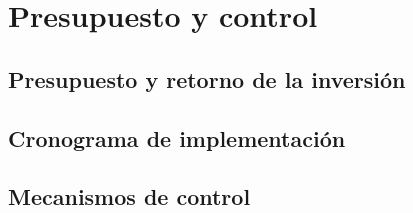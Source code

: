 \chapter{Presupuesto y control}

\section{Presupuesto y retorno de la inversión}

\section{Cronograma de implementación}

\section{Mecanismos de control}